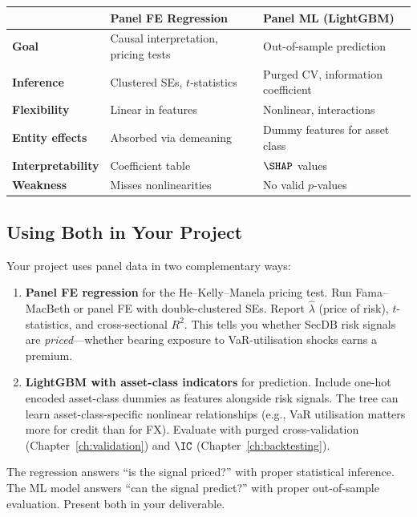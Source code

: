 \begin{center}
\begin{tabular}{lll}
  \toprule
  & \textbf{Panel FE Regression} & \textbf{Panel ML (LightGBM)} \\
  \midrule
  \textbf{Goal} & Causal interpretation, pricing tests & Out-of-sample prediction \\
  \textbf{Inference} & Clustered SEs, $t$-statistics & Purged CV, information coefficient \\
  \textbf{Flexibility} & Linear in features & Nonlinear, interactions \\
  \textbf{Entity effects} & Absorbed via demeaning & Dummy features for asset class \\
  \textbf{Interpretability} & Coefficient table & $\SHAP$ values \\
  \textbf{Weakness} & Misses nonlinearities & No valid $p$-values \\
  \bottomrule
\end{tabular}
\end{center}

\subsection{Using Both in Your Project}

\begin{keyidea}
Your project uses panel data in two complementary ways:
\begin{enumerate}[leftmargin=*]
  \item \textbf{Panel FE regression} for the He--Kelly--Manela pricing test.
    Run Fama--MacBeth or panel FE with double-clustered SEs.
    Report $\hat{\lambda}$ (price of risk), $t$-statistics, and cross-sectional $R^2$.
    This tells you whether SecDB risk signals are \emph{priced}---whether bearing exposure to VaR-utilisation shocks earns a premium.

  \item \textbf{LightGBM with asset-class indicators} for prediction.
    Include one-hot encoded asset-class dummies as features alongside risk signals.
    The tree can learn asset-class-specific nonlinear relationships (e.g., VaR utilisation matters more for credit than for FX).
    Evaluate with purged cross-validation (Chapter~\ref{ch:validation}) and $\IC$ (Chapter~\ref{ch:backtesting}).
\end{enumerate}
The regression answers ``is the signal priced?'' with proper statistical inference.
The ML model answers ``can the signal predict?'' with proper out-of-sample evaluation.
Present both in your deliverable.
\end{keyidea}

